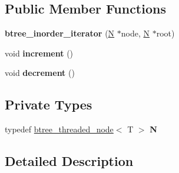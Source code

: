 \subsection*{\-Public \-Member \-Functions}
\begin{DoxyCompactItemize}
\item 
\hypertarget{classtree_1_1btree__inorder__iterator_3_01T_00_01btree__threaded__node_3_01T_01_4_01_4_afd6683f0b4f5a8336d41497ed5d442d9}{{\bfseries btree\-\_\-inorder\-\_\-iterator} (\hyperlink{structtree_1_1btree__threaded__node}{\-N} $\ast$node, \hyperlink{structtree_1_1btree__threaded__node}{\-N} $\ast$root)}\label{classtree_1_1btree__inorder__iterator_3_01T_00_01btree__threaded__node_3_01T_01_4_01_4_afd6683f0b4f5a8336d41497ed5d442d9}

\item 
\hypertarget{classtree_1_1btree__inorder__iterator_3_01T_00_01btree__threaded__node_3_01T_01_4_01_4_ad7bab9e59be6a764fd33a2aa7b938217}{void {\bfseries increment} ()}\label{classtree_1_1btree__inorder__iterator_3_01T_00_01btree__threaded__node_3_01T_01_4_01_4_ad7bab9e59be6a764fd33a2aa7b938217}

\item 
\hypertarget{classtree_1_1btree__inorder__iterator_3_01T_00_01btree__threaded__node_3_01T_01_4_01_4_aa1c7f49bf110199f92d201bebbd475f9}{void {\bfseries decrement} ()}\label{classtree_1_1btree__inorder__iterator_3_01T_00_01btree__threaded__node_3_01T_01_4_01_4_aa1c7f49bf110199f92d201bebbd475f9}

\end{DoxyCompactItemize}
\subsection*{\-Private \-Types}
\begin{DoxyCompactItemize}
\item 
\hypertarget{classtree_1_1btree__inorder__iterator_3_01T_00_01btree__threaded__node_3_01T_01_4_01_4_a5c79484a07c883063ddbf6a545880231}{typedef \hyperlink{structtree_1_1btree__threaded__node}{btree\-\_\-threaded\-\_\-node}$<$ \-T $>$ {\bfseries \-N}}\label{classtree_1_1btree__inorder__iterator_3_01T_00_01btree__threaded__node_3_01T_01_4_01_4_a5c79484a07c883063ddbf6a545880231}

\end{DoxyCompactItemize}


\subsection{\-Detailed \-Description}
